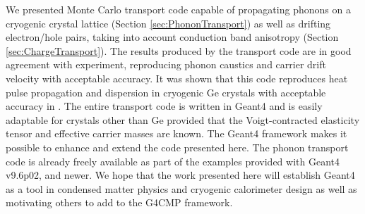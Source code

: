 \documentclass[final,3p,times,twocolumn]{elsarticle}
\begin{document}
 
We presented Monte Carlo transport code capable of propagating phonons on a cryogenic crystal lattice (Section \ref{sec:PhononTransport}) as well as drifting electron/hole pairs, taking into account conduction band anisotropy (Section \ref{sec:ChargeTransport}). The results produced by the transport code are in good agreement with experiment, reproducing phonon caustics and carrier drift velocity with acceptable accuracy. It was shown that this code reproduces heat pulse propagation and dispersion in cryogenic Ge crystals with acceptable accuracy in \cite{Brandt}. The entire transport code is written in Geant4 and is easily adaptable for crystals other than Ge provided that the Voigt-contracted elasticity tensor and effective carrier masses are known. The Geant4 framework makes it possible to enhance and extend the code presented here. The phonon transport code is already freely available as part of the examples provided with  Geant4 v9.6p02, and newer. 
We hope that the work presented here will establish Geant4 as a tool in condensed matter physics and cryogenic calorimeter design as well as motivating others to add to the G4CMP framework.



\end{document}
